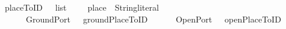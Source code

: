 \isamarkupfalse%
\ placeToID\ {\isacharcolon}{\isacharcolon}\ {\isachardoublequoteopen}\ list\ {\isasymRightarrow}\ {\isacharparenleft}\ \ \ place\ {\isasymRightarrow}\ String{\isachardot}literal{\isachardoublequoteclose}\isanewline
\ \ \ {\isachardoublequoteopen}\ \ {\isacharequal}\ {\isacharparenleft}\ \ \ \isanewline
\ \ \ \ \ \ GroundPort\ {\isacharunderscore}\ {\isasymRightarrow}\ groundPlaceToID\ \isanewline
\ \ \ \ {\isacharbar}\ OpenPort\ \ {\isasymRightarrow}\ openPlaceToID\ 
